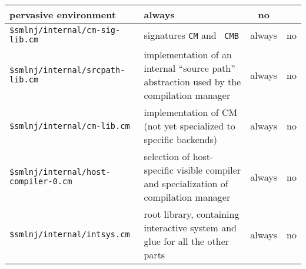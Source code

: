 \begin{small}
\begin{center}
\begin{tabular}{p{2.9in}||p{2.2in}|c|c}
pervasive environment & always & no \\
\hline \hline
{\tt \$smlnj/internal/cm-sig-lib.cm} & signatures {\tt CM} and {\tt
CMB} & always & no \\
\hline
{\tt \$smlnj/internal/srcpath-lib.cm} & implementation of an internal
``source path'' abstraction used by the compilation manager & always &
no \\
\hline
{\tt \$smlnj/internal/cm-lib.cm} & implementation of CM 
(not yet specialized to specific backends) & always & no \\
\hline
{\tt \$smlnj/internal/host-compiler-0.cm} & selection of host-specific
visible compiler and specialization of compilation manager & always &
no \\
\hline
{\tt \$smlnj/internal/intsys.cm} & root library, containing
interactive system and glue for all the other parts & always &
no
\end{tabular}
\end{center}
\end{small}
